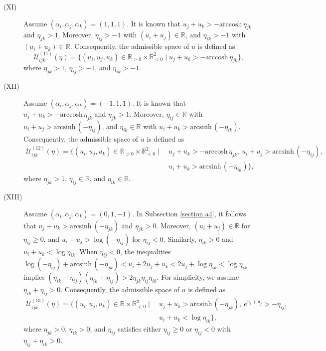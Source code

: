 \documentclass[12pt]{amsart}
\theoremstyle{definition}
\begin{document}
\begin{description}
\item[(XI)]
Assume $(\alpha_i,\alpha_j,\alpha_k)=(1,1,1)$.
It is known that $u_j+u_k>-\mathrm{arccosh}\, \eta_{jk}$ and $\eta_{jk}>1$.
Moreover, $\eta_{ij}>-1$ with $(u_i+u_j)\in \mathbb{R}$, and $\eta_{ik}>-1$ with $(u_i+u_k)\in \mathbb{R}$.
Consequently, the admissible space of $u$ is defined as
\begin{equation}\label{AS11}
\mathcal{U}^{(11)}_{ijk}(\eta)
=\{(u_i,u_j,u_k)\in \mathbb{R}_{>0}\times\mathbb{R}^2_{<0}
\mid u_j+u_k>-\mathrm{arccosh}\, \eta_{jk}\},
\end{equation}
where $\eta_{jk}>1$, $\eta_{ij}>-1$, and $\eta_{ik}>-1$.

\item[(XII)]
Assume $(\alpha_i,\alpha_j,\alpha_k)=(-1,1,1)$.
It is known that $u_j+u_k>-\mathrm{arccosh}\, \eta_{jk}$ and $\eta_{jk}>1$.
Moreover, $\eta_{ij}\in \mathbb{R}$ with $u_i+u_j>\mathrm{arcsinh}\, (-\eta_{ij})$, and $\eta_{ik}\in \mathbb{R}$ with $u_i+u_k>\mathrm{arcsinh}\, (-\eta_{ik})$.
Consequently, the admissible space of $u$ is defined as
\begin{equation*}
\begin{aligned}
\mathcal{U}^{(12)}_{ijk}(\eta)
=\{(u_i,u_j,u_k)\in \mathbb{R}_{>0}\times\mathbb{R}^2_{<0}
\mid &\ u_j+u_k>-\mathrm{arccosh}\, \eta_{jk},\
u_i+u_j>\mathrm{arcsinh}\, (-\eta_{ij}),\ \\
&\ u_i+u_k>\mathrm{arcsinh}\, (-\eta_{ik})\},
\end{aligned}
\end{equation*}
where $\eta_{jk}>1$, $\eta_{ij}\in \mathbb{R}$, and $\eta_{ik}\in \mathbb{R}$.

\item[(XIII)]
Assume $(\alpha_i,\alpha_j,\alpha_k)=(0,1,-1)$.
In Subsection \ref{section a4}, it follows that $u_j+u_k>\mathrm{arcsinh}\ (-\eta_{jk})$ and $\eta_{jk}>0$.
Moreover, $(u_i+u_j)\in \mathbb{R}$ for $\eta_{ij}\geq0$, and $u_i+u_j>\log(-\eta_{ij})$ for $\eta_{ij}<0$.
Similarly, $\eta_{ik}>0$ and $u_i+u_k<\log \eta_{ik}$.
When $\eta_{ij}<0$, the inequalities
$\log(-\eta_{ij})+\mathrm{arcsinh}\, (-\eta_{jk})<u_i+2u_j+u_k<2u_j+\log \eta_{ik}<\log \eta_{ik}$ implies $(\eta_{ik}-\eta_{ij})(\eta_{ik}+\eta_{ij})>2\eta_{jk}\eta_{ij}\eta_{ik}$.
For simplicity, we assume $\eta_{ik}+\eta_{ij}>0$.
Consequently, the admissible space of $u$ is defined as
\begin{equation*}
\begin{aligned}
\mathcal{U}^{(13)}_{ijk}(\eta)
=\{(u_i,u_j,u_k)\in \mathbb{R}\times\mathbb{R}^2_{<0}
\mid &\ u_j+u_k>\mathrm{arcsinh}\, (-\eta_{jk}),\
e^{u_i+u_j}>-\eta_{ij},\ \\
&\ u_i+u_k<\log \eta_{ik} \},
\end{aligned}
\end{equation*}
where $\eta_{jk}>0$, $\eta_{ik}>0$, and $\eta_{ij}$ satisfies either $\eta_{ij}\geq0$ or $\eta_{ij}<0$ with $\eta_{ij}+\eta_{ik}>0$.


\end{description}
\end{document}
